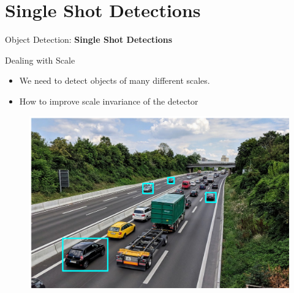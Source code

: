 \section{Single Shot Detections}
\begin{frame}{}
    \LARGE Object Detection: \textbf{Single Shot Detections}
\end{frame}

\begin{frame}{Dealing with Scale}
\begin{itemize}
    \item We need to detect objects of many different scales.
    \item How to improve scale invariance of the detector
\end{itemize}

\begin{figure}
\centering
\includegraphics[width=1.0\textwidth,height=0.7\textheight,keepaspectratio]{images/object-detect/scale_1.png}
\end{figure}
    
\end{frame}

